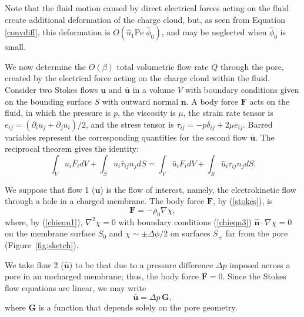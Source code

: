 Note that the fluid motion caused by direct electrical forces acting on the fluid  create additional deformation of the charge cloud, but, as seen from Equation \ref{convdiff}, this deformation is $O({\hat u}_1 \text{Pe}\; \hat\phi_0)$, and may be neglected when
$\hat\phi_0$ is small. 

We now determine the $O(\beta)$ total volumetric flow rate $Q$ through the pore, created by the electrical force acting on the charge cloud within the fluid. Consider two Stokes flows $\mathbf{u}$ and $\bar{\mathbf{u}}$ in a volume $V$ with boundary conditions given on the bounding surface $S$
with outward normal $\mathbf{n}$. A body force $\mathbf{F}$ acts on the fluid, in which the pressure is $p$, the viscosity is $\mu$, the strain rate tensor is $e_{ij}=(\partial_iu_j+\partial_ju_i)/2$, and the stress tensor is $\tau_{ij}= - p \delta_{ij} + 2\mu e_{ij}$. Barred variables represent the corresponding quantities for the second flow $\bar{\mathbf{u}}$. The reciprocal theorem \cite{Happel&Brenner} gives the identity:
\begin{equation}
\int_V u_i \bar{F}_i dV + \int_S u_i \bar{\tau}_{ij} n_j dS = \int_V
\bar{u}_i F_i  dV + \int_S \bar{u}_i \tau_{ij} n_j dS.
\label{eq:recTheo}
\end{equation}

We suppose that flow 1 ($\mathbf{u}$)  is the flow of interest, namely, the electrokinetic flow through a hole in a charged membrane. The body force $\mathbf{F}$, by (\ref{stokes}), is
\begin{equation} 
\mathbf{F} = -\rho_0\nabla\chi,
\label{eq:forceF}
\end{equation} 
where, by (\ref{chieqn1}), $\nabla^2 \chi = 0$ with boundary conditions (\ref{chieqn3})
$\hat{\mathbf{n}} \cdot \nabla \chi = 0$ on the membrane surface $S_0$ and  $\chi \sim \pm \Delta \phi / 2$ on surfaces $S_{\pm}$ far from the pore (Figure~\ref{fig:sketch}).

We take flow 2 ($\bar{\mathbf{u}}$) to be that due to a pressure difference $\Delta p$ imposed across a pore in an uncharged membrane; thus, the body force $\bar{\mathbf{F}}=0$. Since the Stokes flow equations are linear, we may write 
\begin{equation} 
\bar{\mathbf{u}} = \Delta p\, \mathbf{G},
\label{eq:defineG}
\end{equation} 
where $\mathbf{G}$ is a function that depends solely on the pore geometry. 

